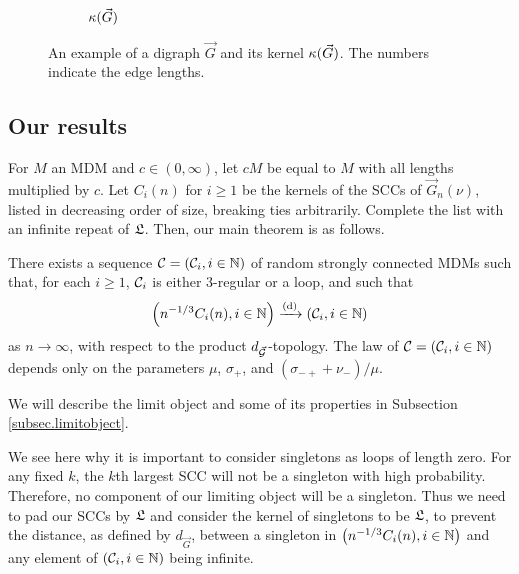 \begin{figure}[htbp]
\begin{subfigure}[htbp]{0.45\textwidth}
        \caption{$\kappa(\vec{G})$}
    \end{subfigure}
    \caption{An example of a digraph $\vec{G}$ and its kernel $\kappa(\vec{G})$. The numbers indicate the edge lengths.}
    \label{fig:kernel}
\end{figure}



\subsection{Our results}

For $M$ an MDM and $c\in (0,\infty)$, let $cM$ be equal to $M$ with all lengths multiplied by $c$. Let $C_i(n)$ for $i\geq 1$ be the kernels of the SCCs of $\vec{G}_n(\nu)$, listed in decreasing order of size, breaking ties arbitrarily. Complete the list with an infinite repeat of $\mathfrak L$. Then, our main theorem is as follows.
\begin{theorem}\label{thm.main}
There exists a sequence ${\mathcal C}=({\mathcal C}_i,i\in {\mathbb N})$ of random strongly connected MDMs such that, for each $i\geq 1$, ${\mathcal C}_i$ is either $3$-regular or a loop, and such that 
$$\left(n^{-1/3}C_i(n),i\in {\mathbb N}\right)\xrightarrow[]{\mathrm{(d)}}\left({\mathcal C}_i,i\in {\mathbb N}\right)$$
as $n\to \infty$, with respect to the product $d_{\vec{{\mathcal G}}}$-topology. The law of ${\mathcal C}=({\mathcal C}_i,i\in {\mathbb N})$ depends only on the parameters $\mu$, $\sigma_+$, and $(\sigma_{-+}+\nu_-)/\mu$.
\end{theorem}
We will describe the limit object and some of its properties in Subsection \ref{subsec.limitobject}.

We see here why it is important to consider singletons as loops of length zero. For any fixed $k$, the $k$th largest SCC will not be a singleton with high probability. Therefore, no component of our limiting object will be a singleton. Thus we need to pad our SCCs by $\mathfrak L$ and consider the kernel of singletons to be $\mathfrak L$, to prevent the distance, as defined by $d_{\vec{G}}$, between a singleton in $\left(n^{-1/3}C_i(n),i\in {\mathbb N}\right)$ and any element of $\left({\mathcal C}_i,i\in {\mathbb N}\right)$ being infinite.

